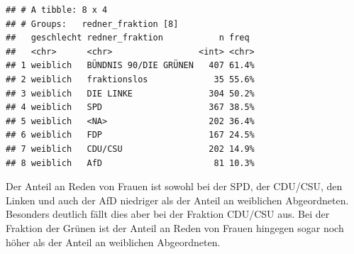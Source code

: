 \documentclass[oneside, 12pt, numbers=endperiod]{scrbook}
\newenvironment{Shaded}{\begin{snugshade}}{\end{snugshade}}
\newcommand{\DataTypeTok}[1]{\textcolor[rgb]{0.13,0.29,0.53}{#1}}
\newcommand{\DecValTok}[1]{\textcolor[rgb]{0.00,0.00,0.81}{#1}}
\newcommand{\KeywordTok}[1]{\textcolor[rgb]{0.13,0.29,0.53}{\textbf{#1}}}
\newcommand{\NormalTok}[1]{#1}
\newcommand{\OperatorTok}[1]{\textcolor[rgb]{0.81,0.36,0.00}{\textbf{#1}}}
\newcommand{\StringTok}[1]{\textcolor[rgb]{0.31,0.60,0.02}{#1}}
\theoremstyle{definition}
\theoremstyle{definition}
\theoremstyle{definition}
\theoremstyle{remark}
\begin{document}
\begin{Shaded}
\end{Shaded}

\begin{verbatim}
## # A tibble: 8 x 4
## # Groups:   redner_fraktion [8]
##   geschlecht redner_fraktion           n freq 
##   <chr>      <chr>                 <int> <chr>
## 1 weiblich   BÜNDNIS 90/DIE GRÜNEN   407 61.4%
## 2 weiblich   fraktionslos             35 55.6%
## 3 weiblich   DIE LINKE               304 50.2%
## 4 weiblich   SPD                     367 38.5%
## 5 weiblich   <NA>                    202 36.4%
## 6 weiblich   FDP                     167 24.5%
## 7 weiblich   CDU/CSU                 202 14.9%
## 8 weiblich   AfD                      81 10.3%
\end{verbatim}

Der Anteil an Reden von Frauen ist sowohl bei der SPD, der CDU/CSU, den
Linken und auch der AfD niedriger als der Anteil an weiblichen
Abgeordneten. Besonders deutlich fällt dies aber bei der Fraktion
CDU/CSU aus. Bei der Fraktion der Grünen ist der Anteil an Reden von
Frauen hingegen sogar noch höher als der Anteil an weiblichen
Abgeordneten.
\end{document}
